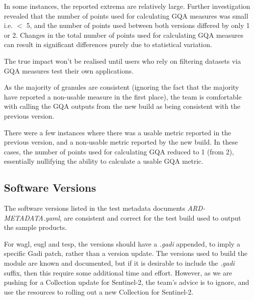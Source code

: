 \documentclass[a4paper]{article}
\begin{document}
      \begin{flushleft}
        In some instances, the reported extrema are relatively large. Further investigation revealed that the number of points used for calculating GQA measures was small i.e. $<$ 5, and the number of points used between both versions differed by only 1 or 2. Changes in the total number of points used for calculating GQA measures can result in significant differences purely due to statistical variation. \par
        The true impact won't be realised until users who rely on filtering datasets via GQA measures test their own applications. \par
        As the majority of granules are consistent (ignoring the fact that the majority have reported a non-usable measure in the first place), the team is comfortable with calling the GQA outputs from the new build as being consistent with the previous version. \par
        There were a few instances where there was a usable metric reported in the previous version, and a non-usable metric reported by the new build. In these cases, the number of points used for calculating GQA reduced to 1 (from 2), essentially nullifying the ability to calculate a usable GQA metric.
      \end{flushleft}

    \subsection{Software Versions}

      \begin{flushleft}
        The software versions listed in the test metadata documents \textit{ARD-METADATA.yaml}, are consistent and correct for the test build used to output the sample products. \par
        For wagl, eugl and tesp, the versions should have a \textit{.gadi} appended, to imply a specific Gadi patch, rather than a version update. The versions used to build the module are known and documented, but if it is desirable to include the \textit{.gadi} suffix, then this require some additional time and effort. However, as we are pushing for a Collection update for Sentinel-2, the team's advice is to ignore, and use the resources to rolling out a new Collection for Sentinel-2.
      \end{flushleft}
\end{document}
